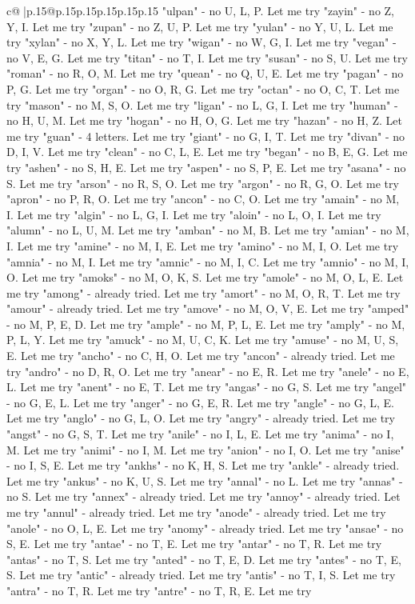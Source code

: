\documentclass{article}
\begin{document}
{\begin{supertabular}{c@{$\;$}|p{.15\linewidth}@{}p{.15\linewidth}p{.15\linewidth}p{.15\linewidth}p{.15\linewidth}p{.15\linewidth}}
{{{"ulpan" {-} no U, L, P. Let me try "zayin" {-} no Z, Y, I. Let me try "zupan" {-} no Z, U, P. Let me try "yulan" {-} no Y, U, L. Let me try "xylan" {-} no X, Y, L. Let me try "wigan" {-} no W, G, I. Let me try "vegan" {-} no V, E, G. Let me try "titan" {-} no T, I. Let me try "susan" {-} no S, U. Let me try "roman" {-} no R, O, M. Let me try "quean" {-} no Q, U, E. Let me try "pagan" {-} no P, G. Let me try "organ" {-} no O, R, G. Let me try "octan" {-} no O, C, T. Let me try "mason" {-} no M, S, O. Let me try "ligan" {-} no L, G, I. Let me try "human" {-} no H, U, M. Let me try "hogan" {-} no H, O, G. Let me try "hazan" {-} no H, Z. Let me try "guan" {-} 4 letters. Let me try "giant" {-} no G, I, T. Let me try "divan" {-} no D, I, V. Let me try "clean" {-} no C, L, E. Let me try "began" {-} no B, E, G. Let me try "ashen" {-} no S, H, E. Let me try "aspen" {-} no S, P, E. Let me try "asana" {-} no S. Let me try "arson" {-} no R, S, O. Let me try "argon" {-} no R, G, O. Let me try "apron" {-} no P, R, O. Let me try "ancon" {-} no C, O. Let me try "amain" {-} no M, I. Let me try "algin" {-} no L, G, I. Let me try "aloin" {-} no L, O, I. Let me try "alumn" {-} no L, U, M. Let me try "amban" {-} no M, B. Let me try "amian" {-} no M, I. Let me try "amine" {-} no M, I, E. Let me try "amino" {-} no M, I, O. Let me try "amnia" {-} no M, I. Let me try "amnic" {-} no M, I, C. Let me try "amnio" {-} no M, I, O. Let me try "amoks" {-} no M, O, K, S. Let me try "amole" {-} no M, O, L, E. Let me try "among" {-} already tried. Let me try "amort" {-} no M, O, R, T. Let me try "amour" {-} already tried. Let me try "amove" {-} no M, O, V, E. Let me try "amped" {-} no M, P, E, D. Let me try "ample" {-} no M, P, L, E. Let me try "amply" {-} no M, P, L, Y. Let me try "amuck" {-} no M, U, C, K. Let me try "amuse" {-} no M, U, S, E. Let me try "ancho" {-} no C, H, O. Let me try "ancon" {-} already tried. Let me try "andro" {-} no D, R, O. Let me try "anear" {-} no E, R. Let me try "anele" {-} no E, L. Let me try "anent" {-} no E, T. Let me try "angas" {-} no G, S. Let me try "angel" {-} no G, E, L. Let me try "anger" {-} no G, E, R. Let me try "angle" {-} no G, L, E. Let me try "anglo" {-} no G, L, O. Let me try "angry" {-} already tried. Let me try "angst" {-} no G, S, T. Let me try "anile" {-} no I, L, E. Let me try "anima" {-} no I, M. Let me try "animi" {-} no I, M. Let me try "anion" {-} no I, O. Let me try "anise" {-} no I, S, E. Let me try "ankhs" {-} no K, H, S. Let me try "ankle" {-} already tried. Let me try "ankus" {-} no K, U, S. Let me try "annal" {-} no L. Let me try "annas" {-} no S. Let me try "annex" {-} already tried. Let me try "annoy" {-} already tried. Let me try "annul" {-} already tried. Let me try "anode" {-} already tried. Let me try "anole" {-} no O, L, E. Let me try "anomy" {-} already tried. Let me try "ansae" {-} no S, E. Let me try "antae" {-} no T, E. Let me try "antar" {-} no T, R. Let me try "antas" {-} no T, S. Let me try "anted" {-} no T, E, D. Let me try "antes" {-} no T, E, S. Let me try "antic" {-} already tried. Let me try "antis" {-} no T, I, S. Let me try "antra" {-} no T, R. Let me try "antre" {-} no T, R, E. Let me try }}}
\end{supertabular}}
\end{document}
